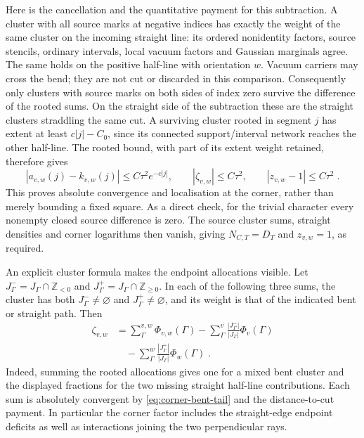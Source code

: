 \documentclass[11pt]{article}
\begin{document}
Here is the cancellation and the quantitative payment for this subtraction. A cluster with all source marks at negative indices has exactly the weight of the same cluster on the incoming straight line: its ordered nonidentity factors, source stencils, ordinary intervals, local vacuum factors and Gaussian marginals agree. The same holds on the positive half-line with orientation $w$. Vacuum carriers may cross the bend; they are not cut or discarded in this comparison. Consequently only clusters with source marks on both sides of index zero survive the difference of the rooted sums. On the straight side of the subtraction these are the straight clusters straddling the same cut. A surviving cluster rooted in segment $j$ has extent at least $c|j|-C_0$, since its connected support/interval network reaches the other half-line. The rooted bound, with part of its extent weight retained, therefore gives
\begin{equation}\label{eq:corner-localisation-bound}
    |a_{v,w}(j)-k_{v,w}(j)|
        \leq C\tau^2e^{-c|j|},
    \qquad
    |\zeta_{v,w}|\leq C\tau^2,
    \qquad |z_{v,w}-1|\leq C\tau^2\;.
\end{equation}
This proves absolute convergence and localisation at the corner, rather than merely bounding a fixed square. As a direct check, for the trivial character every nonempty closed source difference is zero. The source cluster sums, straight densities and corner logarithms then vanish, giving $N_{C,T}=D_T$ and $z_{v,w}=1$, as required.

An explicit cluster formula makes the endpoint allocations visible. Let $J_\Gamma^-=J_\Gamma\cap\mathbb Z_{<0}$ and $J_\Gamma^+=J_\Gamma\cap\mathbb Z_{\geq 0}$. In each of the following three sums, the cluster has both $J_\Gamma^-\ne \varnothing$ and $J_\Gamma^+\ne \varnothing$, and its weight is that of the indicated bent or straight path. Then
\begin{equation}\label{eq:corner-mixed-cluster-formula}
    \begin{aligned}
        \zeta_{v,w}
            &=\sum_{\Gamma}^{v,w}\Phi_{v,w}(\Gamma)
                -\sum_{\Gamma}^{v}
                    \frac{|J_\Gamma^-|}{|J_\Gamma|}\Phi_v(\Gamma)\\
            &\quad-\sum_{\Gamma}^{w}
                    \frac{|J_\Gamma^+|}{|J_\Gamma|}\Phi_w(\Gamma)\;.
    \end{aligned}
\end{equation}
Indeed, summing the rooted allocations gives one for a mixed bent cluster and the displayed fractions for the two missing straight half-line contributions. Each sum is absolutely convergent by \eqref{eq:corner-bent-tail} and the distance-to-cut payment. In particular the corner factor includes the straight-edge endpoint deficits as well as interactions joining the two perpendicular rays.
\end{document}
